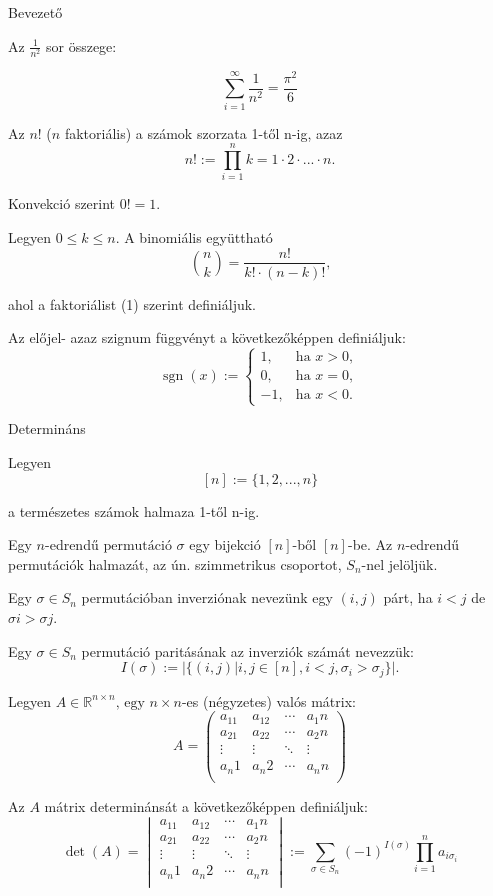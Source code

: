 \documentclass{article}
\begin{document}
Bevezető

Az $\frac{1}{n^2} $ sor összege:

\[\sum_{i=1}^\infty\frac{1}{n^2}=\frac{\pi^2}{6}\]

Az $n!$ ($n$ faktoriális) a számok szorzata 1-től n-ig, azaz
\begin{equation}
n! := \prod_{i=1}^n k = 1 \cdot 2 \cdot ...\cdot n\text{.}
\end{equation}

Konvekció szerint $0! = 1$.

Legyen $0 \leq k \leq n$. A binomiális együttható
\[\binom{n}{k} = \frac{n!}{k! \cdot (n-k)!}\text{,}\]

ahol a faktoriálist (1) szerint definiáljuk.

Az előjel- azaz szignum függvényt a következőképpen definiáljuk:
\[\operatorname{sgn}(x) := \begin{cases}
1, & \text{ha } x > 0, \\
0, & \text{ha } x = 0, \\
-1, & \text{ha } x < 0.
\end{cases}\]

Determináns

Legyen
\[[n] := \lbrace1, 2, ..., n\rbrace\]

a természetes számok halmaza 1-től n-ig.

Egy $n$-edrendű $\text{permutáció }\sigma$ egy bijekció $[n]$-ből $[n]$-be. Az $n$-edrendű permutációk halmazát, az ún. szimmetrikus csoportot, $S_n$-nel jelöljük.

Egy $\sigma \in S_n$ permutációban inverziónak nevezünk egy $(i, j)$ párt, ha $i < j$
de $\sigma i > \sigma j$.

Egy $\sigma \in S_n$ permutáció paritásának az inverziók számát nevezzük:
\[I(\sigma) := \vert\lbrace(i, j) \vert i, j \in [n], i < j, \sigma_i > \sigma_j \rbrace\vert.\]

Legyen $A \in \mathbb{R}^{n \times n} \text{, egy }n \times n$-es (négyzetes) valós mátrix:
\[ A = \left( \begin{matrix}
a_11 & a_12 & \cdots & a_1n \\
a_21 & a_22 & \cdots & a_2n \\
\vdots & \vdots & \ddots & \vdots \\
a_n1 & a_n2 & \cdots & a_nn \\
\end{matrix} \right) \]

Az $A$ mátrix determinánsát a következőképpen definiáljuk:
\begin{equation}
\operatorname{det}(A) =  \begin{vmatrix}
a_11 & a_12 & \cdots & a_1n \\
a_21 & a_22 & \cdots & a_2n \\
\vdots & \vdots & \ddots & \vdots \\
a_n1 & a_n2 & \cdots & a_nn \\
\end{vmatrix} := \sum_{\sigma \in S_n} (-1)^{I(\sigma)} \prod_{i=1}^n a_{i\sigma_i}
\end{equation}
\end{document}
